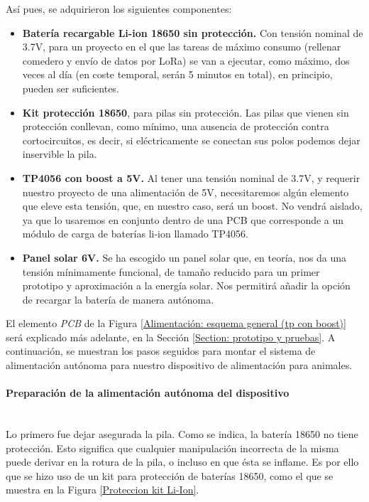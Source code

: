 \documentclass[12pt]{article}
\newcommand{\subsubsubsection}[1]{\paragraph{#1}\mbox{}\\}
\begin{document}
	\pagebreak
	
	\noindent Así pues,  se adquirieron los siguientes componentes: 
	
	\begin{itemize}
		\item \textbf{Batería recargable Li-ion 18650 sin protección.} Con tensión nominal de 3.7V, para un proyecto en el que las tareas de máximo consumo (rellenar comedero y envío de datos por LoRa) se van a ejecutar, como máximo, dos veces al día (en coste temporal, serán 5 minutos en total), en principio, pueden ser suficientes.
		\item \textbf{Kit protección 18650}, para pilas sin protección. Las pilas que vienen sin protección conllevan, como mínimo, una ausencia de protección contra cortocircuitos, es decir, si eléctricamente se conectan sus polos podemos dejar inservible la pila.
		\item \textbf{TP4056 con boost a 5V.} Al tener una tensión nominal de 3.7V, y requerir nuestro proyecto de una alimentación de 5V, necesitaremos algún elemento que eleve esta tensión, que, en nuestro caso, será un boost. No vendrá aislado, ya que lo usaremos en conjunto dentro de una PCB que corresponde a un módulo de carga de baterías li-ion llamado TP4056.
		\item \textbf{Panel solar 6V.} Se ha escogido un panel solar que, en teoría, nos da una tensión mínimamente funcional, de tamaño reducido para un primer prototipo y aproximación a la energía solar. Nos permitirá añadir la opción de recargar la batería de manera autónoma.
	\end{itemize}

	\noindent El elemento \textit{PCB} de la Figura \ref{Alimentación: esquema general (tp con boost)} será explicado más adelante, en la Sección \ref{Section: prototipo y pruebas}. A continuación, se muestran los pasos seguidos para montar el sistema de alimentación autónoma para nuestro dispositivo de alimentación para animales. \\
	
	\subsubsubsection{Preparación de la alimentación autónoma del dispositivo}
	
	\noindent Lo primero fue dejar asegurada la pila. Como se indica, la batería 18650 no tiene protección. Esto significa que cualquier manipulación incorrecta de la misma puede derivar en la rotura de la pila, o incluso en que ésta se inflame. Es por ello que se hizo uso de un kit para protección de baterías 18650, como el que se muestra en la Figura \ref{Proteccion kit Li-Ion}.\\
	
\end{document}
